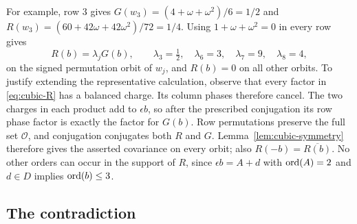 For example, row $3$ gives
$G(w_3)=(4+\omega+\omega^2)/6=1/2$ and
$R(w_3)=(60+42\omega+42\omega^2)/72=1/4$.
Using $1+\omega+\omega^2=0$ in every row gives
\begin{equation}\label{eq:cubic-R-multipliers}
 R(b)=\lambda_jG(b),\qquad
 \lambda_3=\tfrac12,\quad \lambda_6=3,\quad
 \lambda_7=9,\quad \lambda_8=4,
\end{equation}
on the signed permutation orbit of $w_j$, and $R(b)=0$ on all other
orbits. To justify extending the representative calculation, observe
that every factor in \eqref{eq:cubic-R} has a balanced charge. Its
column phases therefore cancel. The two charges in each product add
to $\epsilon b$, so after the prescribed conjugation its row phase
factor is exactly the factor for $G(b)$. Row permutations preserve
the full set $\mathcal O$, and conjugation conjugates both $R$ and $G$.
Lemma~\ref{lem:cubic-symmetry} therefore gives the asserted covariance
on every orbit; also $R(-b)=\overline{R(b)}$. No other orders can occur
in the support of $R$, since $\epsilon b=A+d$ with
$\operatorname{ord}(A)=2$ and $d\in D$ implies $\operatorname{ord}(b)\le3$.

\subsection{The contradiction}

